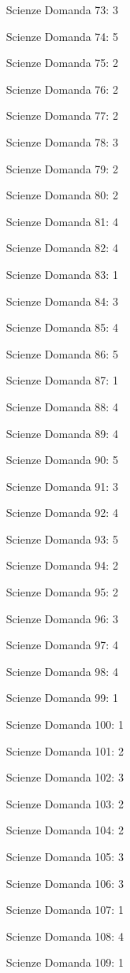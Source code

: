 \documentclass[20pt, a4paper]{article}
\begin{document}
\begin{itemize}[leftmargin=*]
\item [Scienze] Domanda 73: 3
\item [Scienze] Domanda 74: 5
\item [Scienze] Domanda 75: 2
\item [Scienze] Domanda 76: 2
\item [Scienze] Domanda 77: 2
\item [Scienze] Domanda 78: 3
\item [Scienze] Domanda 79: 2
\item [Scienze] Domanda 80: 2
\item [Scienze] Domanda 81: 4
\item [Scienze] Domanda 82: 4
\item [Scienze] Domanda 83: 1
\item [Scienze] Domanda 84: 3
\item [Scienze] Domanda 85: 4
\item [Scienze] Domanda 86: 5
\item [Scienze] Domanda 87: 1
\item [Scienze] Domanda 88: 4
\item [Scienze] Domanda 89: 4
\item [Scienze] Domanda 90: 5
\item [Scienze] Domanda 91: 3
\item [Scienze] Domanda 92: 4
\item [Scienze] Domanda 93: 5
\item [Scienze] Domanda 94: 2
\item [Scienze] Domanda 95: 2
\item [Scienze] Domanda 96: 3
\item [Scienze] Domanda 97: 4
\item [Scienze] Domanda 98: 4
\item [Scienze] Domanda 99: 1
\item [Scienze] Domanda 100: 1
\item [Scienze] Domanda 101: 2
\item [Scienze] Domanda 102: 3
\item [Scienze] Domanda 103: 2
\item [Scienze] Domanda 104: 2
\item [Scienze] Domanda 105: 3
\item [Scienze] Domanda 106: 3
\item [Scienze] Domanda 107: 1
\item [Scienze] Domanda 108: 4
\item [Scienze] Domanda 109: 1

\end{itemize}
\end{document}
